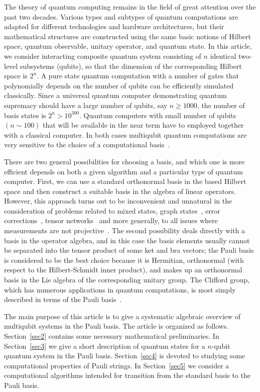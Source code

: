 \documentclass[12pt,a4paper,twoside]{article}      %
\begin{document}
The theory of quantum computing remains in the field of great attention over the past two decades. Various types and subtypes of quantum computations are adapted for different technologies and hardware architectures, but their mathematical structures are constructed using the same basic notions of Hilbert space, quantum observable, unitary operator, and quantum state. In this article, we consider interacting composite quantum system consisting of $n$ identical two-level subsystems (qubits), so that the dimension of the corresponding Hilbert space is $2^n$. A pure state quantum computation with a number of gates that polynomially depends on the number of qubits can be efficiently simulated classically. Since a universal quantum computer demonstrating quantum supremacy should have a large number of qubits, say $n\geq1000$, the number of basis states is $2^n>10^{300}$. Quantum computers with small number of qubits $(n\sim100)$ that will be available in the near term have to employed together with a classical computer. In both cases  multiqubit quantum computations are very sensitive to the choice of a computational basis~\cite{Dirkse2020,Hamamura2020,Crawford2021}.

There are two general possibilities for choosing a basis, and which one is more efficient depends on both a given algorithm and a particular type of quantum computer. First, we can use a standard orthonormal basis in the based Hilbert space and then construct a suitable basis in the algebra of linear  operators. However, this approach turns out to be inconvenient and unnatural in the consideration of problems related to mixed states, graph states~\cite{Klobus2019}, error corrections~\cite{Crawford2021,OConnor2013, Riofrio2017}, tensor networks~\cite{Jahromi2019, Tsirulev2020, Potashov2018} and more generally, to all issues where measurements are not projective~\cite{Bravyi2004, Danos2006, Danos2007}. The second possibility deals directly with a basis in the operator algebra, and in this case the basis elements usually cannot be separated into the tensor product of some ket and bra vectors; the Pauli basis is considered to be the best choice because it is Hermitian, orthonormal (with respect to the Hilbert-Schmidt inner product), and makes up an orthonormal basis in the Lie algebra of the corresponding unitary group. The Clifford group, which has numerous applications in quantum computations, is most simply described in terms of the Pauli basis~\cite{Bravyi2004, Bravyi2020}.

The main purpose of this article is to give a systematic algebraic overview of multiqubit systems in the Pauli basis. The article is organized as follows. Section~\ref{sec2} contains some necessary mathematical preliminaries. In Section~\ref{sec3} we give a short description of quantum states for a $n$-qubit quantum system in the Pauli basis.  Section~\ref{sec4} is devoted to studying some computational properties of Pauli strings. In Section~\ref{sec5} we consider a computational algorithms intended for transition from the standard basis to the Pauli basis.
\end{document}
